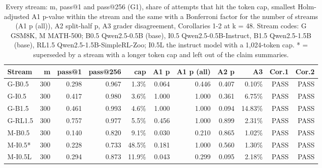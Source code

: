 \begin{table}[t]
\centering
\small
\begin{tabular}{lrrrrrrrrrr}
\toprule
Stream & m & pass@1 & pass@256 & cap & A1 p & A1 p (all) & A2 p & A3 & Cor.1 & Cor.2 \\
\midrule
G-B0.5 & 300 & 0.298 & 0.967 & 1.3\% & 0.064 & 0.446 & 0.407 & 0.10\% & PASS & PASS \\
G-I0.5 & 300 & 0.417 & 0.980 & 3.6\% & 1.000 & 1.000 & 0.361 & 6.75\% & PASS & PASS \\
G-B1.5 & 300 & 0.461 & 0.993 & 4.6\% & 1.000 & 1.000 & 0.094 & 14.83\% & PASS & PASS \\
G-RL1.5 & 300 & 0.757 & 0.977 & 5.5\% & 0.456 & 1.000 & 0.899 & 2.31\% & PASS & PASS \\
M-B0.5 & 300 & 0.140 & 0.820 & 9.1\% & 0.030 & 0.210 & 0.865 & 1.02\% & PASS & PASS \\
M-I0.5* & 300 & 0.228 & 0.733 & 48.5\% & 0.181 & 1.000 & 0.560 & 1.30\% & PASS & PASS \\
M-I0.5L & 300 & 0.294 & 0.873 & 11.9\% & 0.043 & 0.299 & 0.095 & 2.18\% & PASS & PASS \\
\bottomrule
\end{tabular}
\caption{Every stream: m, pass@1 and pass@256 (G1), share of attempts that hit the token cap, smallest Holm-adjusted A1 p-value within the stream and the same with a Bonferroni factor for the number of streams (A1 p (all)), A2 split-half p, A3 grader disagreement, Corollaries 1-2 at k = 48. Stream codes: G GSM8K, M MATH-500; B0.5 Qwen2.5-0.5B (base), I0.5 Qwen2.5-0.5B-Instruct, B1.5 Qwen2.5-1.5B (base), RL1.5 Qwen2.5-1.5B-SimpleRL-Zoo; I0.5L the instruct model with a 1,024-token cap. * = superseded by a stream with a longer token cap and left out of the claim summaries.}
\label{tab:T12a_streams_checks}
\end{table}
